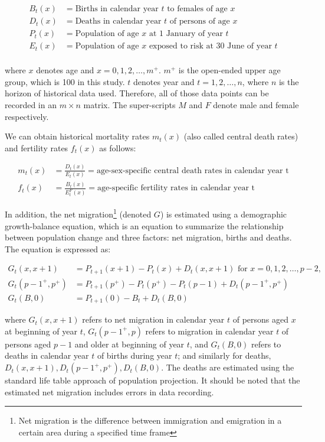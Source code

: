 \documentclass[11pt,a4paper,]{article}
\begin{document}
\begin{align*}
  B_t(x) &= \text{Births in calendar year $t$ to females of age $x$}\\
  D_t(x) &= \text{Deaths in calendar year $t$ of persons of age $x$}\\
  P_t(x) &= \text{Population of age $x$ at 1 January of year $t$}\\
  E_t(x) &= \text{Population of age $x$ exposed to risk at 30 June of year $t$}\\
\end{align*}

where \(x\) denotes age and \(x=0,1,2,\dots,m^+\). \(m^+\) is the
open-ended upper age group, which is 100 in this study. \(t\) denotes
year and \(t=1,2,\dots,n\), where \(n\) is the horizon of historical
data used. Therefore, all of those data points can be recorded in an
\(m\times n\) matrix. The super-scripts \(M\) and \(F\) denote male and
female respectively.

We can obtain historical mortality rates \(m_t(x)\) (also called central
death rates) and fertility rates \(f_t(x)\) as follows:

\begin{align*}
  m_t(x) & = \frac{D_t(x)}{E_t(x)}=\text{age-sex-specific central death rates in calendar year t}\\
  f_t(x) & = \frac{B_t(x)}{E^F_t(x)}=\text{age-specific fertility rates in calendar year t}
\end{align*}

In addition, the net
migration\footnote{Net migration is the difference between immigration and emigration in a certain area during a specified time frame}
(denoted \(G\)) is estimated using a demographic growth-balance
equation, which is an equation to summarize the relationship between
population change and three factors: net migration, births and deaths.
The equation is expressed as: 

\begin{align*}
  G_t(x,x+1)     & =P_{t+1}(x+1)-P_t(x)+D_t(x,x+1)\text{~for~} x=0,1,2,\dots,p-2,\\
  G_t(p-1^+,p^+) & =P_{t+1}(p^+)-P_t(p^+)-P_t(p-1)+D_t(p-1^+,p^+)\\
  G_t(B,0)       & =P_{t+1}(0)-B_t+D_t(B,0)
\end{align*}

where \(G_t(x,x+1)\) refers to net migration in calendar year \(t\) of
persons aged \(x\) at beginning of year \(t\), \(G_t(p-1^+,p)\) refers
to migration in calendar year \(t\) of persons aged \(p-1\) and older at
beginning of year \(t\), and \(G_t(B,0)\) refers to deaths in calendar
year \(t\) of births during year \(t\); and similarly for deaths,
\(D_t(x,x+1), D_t(p-1^+,p^+), D_t(B,0)\). The deaths are estimated using
the standard life table approach of population projection. It should be
noted that the estimated net migration includes errors in data
recording.
\end{document}
